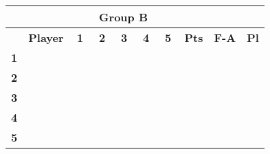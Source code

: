 \documentclass[10pt]{article}
\newcommand{\red}{\color{red}}
\newcommand{\blue}{\color{blue}}
\newcommand{\blank}{\cellcolor[gray]{.5}}
\begin{document}
\begin{tabular}{|c|p{2.8cm}|c|c|c|c|c|c|c|c|}
	\multicolumn{9}{c}{\bf Group B} \\ \hline
	& \bf Player & \bf1 & \bf2 & \bf3 & \bf4 & \bf5 & \bf Pts & \bf F-A & \bf Pl \\ \hline
	\multirow{2}{*}{\bf1}&\multirow{2}{*}{}      & \blank$\quad$ & \red$\quad$ & \red$\quad$ & \red$\quad$ & \red$\quad$ &\multirow{2}{*}{}&\multirow{2}{*}{}&\multirow{2}{*}{} \\ && \blank & \red & \blue & \red & \red &&& \\ \hline
	\multirow{2}{*}{\bf2}&\multirow{2}{*}{\it}     & \blue & \blank & \red & \red & \red &\multirow{2}{*}{}&\multirow{2}{*}{}&\multirow{2}{*}{} \\      && \blue & \blank &  & \red & \red &&& \\ \hline
	\multirow{2}{*}{\bf3}&\multirow{2}{*}{\it}     & \blue & \blue & \blank & \red & \red &\multirow{2}{*}{}&\multirow{2}{*}{}&\multirow{2}{*}{} \\     && \red &  & \blank & \blue & \red &&& \\ \hline
	\multirow{2}{*}{\bf4}&\multirow{2}{*}{\it}     & \blue & \blue & \blue & \blank & \red &\multirow{2}{*}{}&\multirow{2}{*}{}&\multirow{2}{*}{} \\     && \blue & \blue & \red & \blank & \red &&& \\ \hline
	\multirow{2}{*}{\bf5}&\multirow{2}{*}{\it}     & \blue & \blue & \blue & \red & \blank &\multirow{2}{*}{}&\multirow{2}{*}{}&\multirow{2}{*}{} \\     && \blue & \blue & \red & \red & \blank &&& \\ \hline
\end{tabular}
\hspace{-1.5cm}
\bigskip
\end{document}
